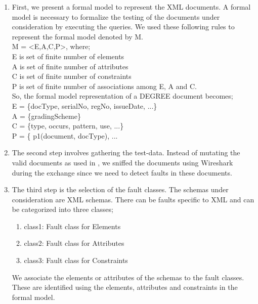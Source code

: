 \documentclass[12pt,a4paper,oneside]{book}
\begin{document}
	\begin{enumerate}  

		\item First, we present a formal model to represent the XML documents. A formal model is necessary to formalize the testing of the documents under consideration by executing the queries. We used these following rules to represent the formal model denoted by M. \\
		M = \textless E,A,C,P\textgreater , where; \\
		E is set of finite number of elements \\
		A is set of finite number of attributes \\
		C is set of finite number of constraints \\
		P is set of finite number of associations among E, A and C. \\
		
		So, the formal model representation of a DEGREE document becomes; \\
		E = \{docType, serialNo, regNo, issueDate, ...\} \\
		A = \{gradingScheme\} \\
		C = \{type, occurs, pattern, use, ...\} \\
		P = \{ p1(document, docType), ...

		\item The second step involves gathering the test-data. Instead of mutating the valid documents as used in \cite{Testing XML Schemas} \cite{Fault based Testing}, we sniffed the documents using Wireshark during the exchange since we need to detect faults in these documents. 
		
	
		\item The third step is the selection of the fault classes. The schemas under consideration are XML schemas. There can be faults specific to XML and can be categorized into three classes;
		
		\begin{enumerate} 
			\item class1: Fault class for Elements
			\item class2: Fault class for Attributes
			\item class3: Fault class for Constraints
		\end{enumerate}
		
		We associate the elements or attributes of the schemas to the fault classes. These are identified using the elements, attributes and constraints in the formal model.		
		

\end{enumerate}
\end{document}
